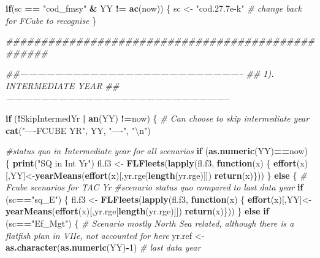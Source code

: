 \documentclass[
]{article}
\newenvironment{Shaded}{\begin{snugshade}}{\end{snugshade}}
\newcommand{\CharTok}[1]{\textcolor[rgb]{0.31,0.60,0.02}{#1}}
\newcommand{\CommentTok}[1]{\textcolor[rgb]{0.56,0.35,0.01}{\textit{#1}}}
\newcommand{\ControlFlowTok}[1]{\textcolor[rgb]{0.13,0.29,0.53}{\textbf{#1}}}
\newcommand{\DecValTok}[1]{\textcolor[rgb]{0.00,0.00,0.81}{#1}}
\newcommand{\KeywordTok}[1]{\textcolor[rgb]{0.13,0.29,0.53}{\textbf{#1}}}
\newcommand{\NormalTok}[1]{#1}
\newcommand{\OperatorTok}[1]{\textcolor[rgb]{0.81,0.36,0.00}{\textbf{#1}}}
\newcommand{\StringTok}[1]{\textcolor[rgb]{0.31,0.60,0.02}{#1}}
\begin{document}
\begin{Shaded}
\begin{Highlighting}[]
    \ControlFlowTok{if}\NormalTok{(sc }\OperatorTok{==}\StringTok{ "cod_fmsy"} \OperatorTok{&}\StringTok{ }\NormalTok{YY }\OperatorTok{!=}\StringTok{ }\KeywordTok{ac}\NormalTok{(now)) \{}
\NormalTok{        sc <-}\StringTok{ "cod.27.7e-k"}  \CommentTok{# change back for FCube to recognise}
\NormalTok{        \}}
        

\CommentTok{##################################################}

        \CommentTok{##-----------------------------------------------------------------------------}
        \CommentTok{## 1). INTERMEDIATE YEAR}
        \CommentTok{##-----------------------------------------------------------------------------}

        \ControlFlowTok{if}\NormalTok{ (}\OperatorTok{!}\NormalTok{SkipIntermedYr }\OperatorTok{|}\StringTok{ }\KeywordTok{an}\NormalTok{(YY) }\OperatorTok{!=}\NormalTok{now) \{   }\CommentTok{# Can choose to skip intermediate year}
            \KeywordTok{cat}\NormalTok{(}\StringTok{"----FCUBE YR"}\NormalTok{, YY, }\StringTok{"----"}\NormalTok{, }\StringTok{"}\CharTok{\textbackslash{}n}\StringTok{"}\NormalTok{)}

            \CommentTok{#status quo in Intermediate year for all scenarios}
            \ControlFlowTok{if}\NormalTok{ (}\KeywordTok{as.numeric}\NormalTok{(YY)}\OperatorTok{==}\NormalTok{now) \{}
                \KeywordTok{print}\NormalTok{(}\StringTok{"SQ in Int Yr"}\NormalTok{)}
\NormalTok{                fl.f3 <-}\StringTok{ }\KeywordTok{FLFleets}\NormalTok{(}\KeywordTok{lapply}\NormalTok{(fl.f3, }\ControlFlowTok{function}\NormalTok{(x) \{}
                            \KeywordTok{effort}\NormalTok{(x)[,YY]<-}\KeywordTok{yearMeans}\NormalTok{(}\KeywordTok{effort}\NormalTok{(x)[,yr.rge[}\KeywordTok{length}\NormalTok{(yr.rge)]])}
                            \KeywordTok{return}\NormalTok{(x)\}))}
\NormalTok{            \} }\ControlFlowTok{else}\NormalTok{ \{  }\CommentTok{# Fcube scenarios for TAC Yr}
                \CommentTok{#scenario status quo compared to last data year}
                \ControlFlowTok{if}\NormalTok{ (sc}\OperatorTok{==}\StringTok{"sq_E"}\NormalTok{) \{}
\NormalTok{                    fl.f3 <-}\StringTok{ }\KeywordTok{FLFleets}\NormalTok{(}\KeywordTok{lapply}\NormalTok{(fl.f3, }\ControlFlowTok{function}\NormalTok{(x) \{}
                                \KeywordTok{effort}\NormalTok{(x)[,YY]<-}\KeywordTok{yearMeans}\NormalTok{(}\KeywordTok{effort}\NormalTok{(x)[,yr.rge[}\KeywordTok{length}\NormalTok{(yr.rge)]])}
                                \KeywordTok{return}\NormalTok{(x)\}))}
\NormalTok{                \} }\ControlFlowTok{else} \ControlFlowTok{if}\NormalTok{ (sc}\OperatorTok{==}\StringTok{"Ef_Mgt"}\NormalTok{) \{}
                          \CommentTok{# Scenario mostly North Sea related, although there is a flatfish plan in VIIe, not accounted for here}
\NormalTok{                          yr.ref <-}\StringTok{ }\KeywordTok{as.character}\NormalTok{(}\KeywordTok{as.numeric}\NormalTok{(YY)}\OperatorTok{-}\DecValTok{1}\NormalTok{) }\CommentTok{# last data year}


\end{Highlighting}
\end{Shaded}
\end{document}
